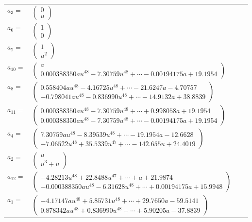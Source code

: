 \documentclass[1p]{elsarticle_modified}
\theoremstyle{definition}
\begin{document}
\begin{tabular}{m{7pt} m{180pt} m{7pt} m{180pt} }
\flushright $a_{3}=$&$\begin{pmatrix}0\\u\end{pmatrix}$ \\
\flushright $a_{6}=$&$\begin{pmatrix}1\\0\end{pmatrix}$ \\
\flushright $a_{7}=$&$\begin{pmatrix}1\\u^2\end{pmatrix}$ \\
\flushright $a_{10}=$&$\begin{pmatrix}a\\0.000388350 a u^{48}-7.30759 u^{48}+\cdots-0.00194175 a+19.1954\end{pmatrix}$ \\
\flushright $a_{8}=$&$\begin{pmatrix}0.558404 a u^{48}-4.16725 u^{48}+\cdots-21.6247 a-4.70757\\-0.798041 a u^{48}-0.836990 u^{48}+\cdots-14.9132 a+38.8839\end{pmatrix}$ \\
\flushright $a_{11}=$&$\begin{pmatrix}0.000388350 a u^{48}-7.30759 u^{48}+\cdots+0.998058 a+19.1954\\0.000388350 a u^{48}-7.30759 u^{48}+\cdots-0.00194175 a+19.1954\end{pmatrix}$ \\
\flushright $a_{4}=$&$\begin{pmatrix}7.30759 a u^{48}-8.39539 u^{48}+\cdots-19.1954 a-12.6628\\-7.06522 u^{48}+35.5339 u^{47}+\cdots-142.655 u+24.4019\end{pmatrix}$ \\
\flushright $a_{2}=$&$\begin{pmatrix}u\\u^3+u\end{pmatrix}$ \\
\flushright $a_{12}=$&$\begin{pmatrix}-4.28213 u^{48}+22.8488 u^{47}+\cdots+a+21.9874\\-0.000388350 a u^{48}-6.31628 u^{48}+\cdots+0.00194175 a+15.9948\end{pmatrix}$ \\
\flushright $a_{1}=$&$\begin{pmatrix}-4.17147 a u^{48}+5.85731 u^{48}+\cdots+29.7650 a-59.5141\\0.878342 a u^{48}+0.836990 u^{48}+\cdots+5.90205 a-37.8839\end{pmatrix}$ \\

\end{tabular}
\end{document}
